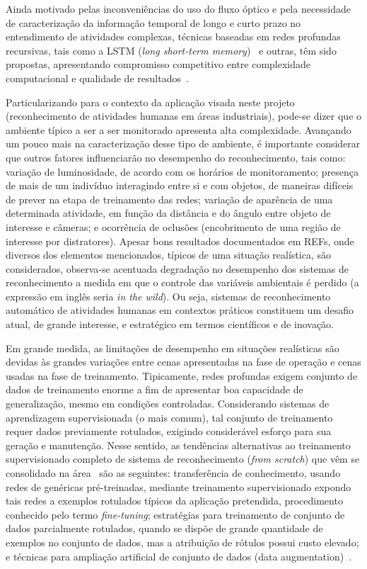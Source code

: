 %
Ainda motivado pelas inconveniências do uso do fluxo óptico e pela necessidade de caracterização da informação temporal de longo e curto prazo no entendimento de atividades complexas, técnicas baseadas em redes profundas recursivas, tais como a LSTM (\emph{long short-term memory})~\parencite{hochreiter-1997} e outras, têm sido propostas, apresentando compromisso competitivo entre complexidade computacional e qualidade de resultados~\parencite{donahue-2016, herath-2017, xia-2020}.

Particularizando para o contexto da aplicação visada neste projeto (reconhecimento de atividades humanas em áreas industriais), pode-se dizer que o ambiente típico a ser a ser monitorado apresenta alta complexidade. Avançando um pouco mais na caracterização desse tipo de ambiente, é importante considerar que outros fatores influenciarão no desempenho do reconhecimento, tais como: variação de luminosidade, de acordo com os horários de monitoramento; presença de mais de um indivíduo interagindo entre si e com objetos, de maneiras difíceis de prever na etapa de treinamento das redes; variação de aparência de uma determinada atividade, em função da distância e do ângulo entre objeto de interesse e câmeras; e ocorrência de oclusões (encobrimento de uma região de interesse por distratores).
%
Apesar bons resultados documentados em REFs, onde diversos dos elementos mencionados, típicos de uma situação realística, são considerados, observa-se acentuada degradação no desempenho dos sistemas de reconhecimento a medida em que o controle das variáveis ambientais é perdido (a expressão em inglês seria \emph{in the wild}). Ou seja, sistemas de reconhecimento automático de atividades humanas em contextos práticos constituem um desafio atual, de grande interesse, e estratégico em termos científicos e de inovação.

Em grande medida, as limitações de desempenho em situações realísticas são devidas às grandes variações entre cenas apresentadas na fase de operação e cenas usadas na fase de treinamento. Tipicamente, redes profundas exigem  conjunto de dados de treinamento enorme a fim de apresentar boa capacidade de generalização, mesmo em condições controladas. Considerando sistemas de aprendizagem supervisionada (o mais comum), tal conjunto de treinamento requer dados previamente rotulados, exigindo considerável esforço para sua geração e manutenção. Nesse sentido, as tendências alternativas ao treinamento supervisionado completo de sistema de reconhecimento (\emph{from scratch}) que vêm se consolidado na área~\parencite{herath-2017} são as seguintes: transferência de conhecimento, usando redes de genéricas pré-treinadas, mediante treinamento supervisionado expondo tais redes a exemplos rotulados típicos da aplicação pretendida, procedimento conhecido pelo termo \emph{fine-tuning}; estratégias para treinamento de conjunto de dados parcialmente rotulados, quando se dispõe de grande quantidade de exemplos no conjunto de dados, mas a atribuição de rótulos possui custo elevado; e técnicas para ampliação artificial de conjunto de dados (data augmentation)~\parencite{wang-2015}.

